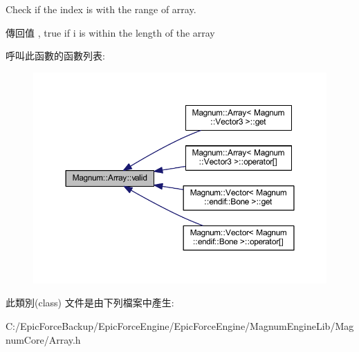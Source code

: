 Check if the index is with the range of array. 

\begin{DoxyReturn}{傳回值}
, true if i is within the length of the array 
\end{DoxyReturn}


呼叫此函數的函數列表\+:\nopagebreak
\begin{figure}[H]
\begin{center}
\leavevmode
\includegraphics[width=350pt]{class_magnum_1_1_array_af71c6a4a87cd0d359551fe9ea304668e_icgraph}
\end{center}
\end{figure}




此類別(class) 文件是由下列檔案中產生\+:\begin{DoxyCompactItemize}
\item 
C\+:/\+Epic\+Force\+Backup/\+Epic\+Force\+Engine/\+Epic\+Force\+Engine/\+Magnum\+Engine\+Lib/\+Magnum\+Core/Array.\+h\end{DoxyCompactItemize}
